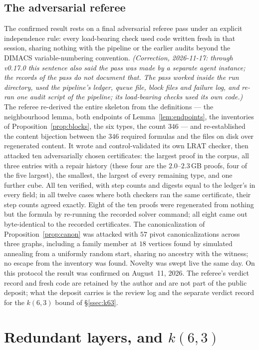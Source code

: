 \documentclass[11pt]{amsart}
\theoremstyle{plain}
\theoremstyle{definition}
\theoremstyle{remark}
\begin{document}
\subsection{The adversarial referee}\label{ssec:referee}
The confirmed result rests on a final adversarial referee pass under an
explicit independence rule: every load-bearing check used code written
fresh in that session, sharing nothing with the pipeline or the earlier
audits beyond the DIMACS variable-numbering convention.
\emph{(Correction, 2026-11-17: through v0.17.0 this sentence also said
the pass was made by a separate agent instance; the records of the pass
do not document that. The pass worked inside the run directory, used the
pipeline's ledger, queue file, block files and failure log, and re-ran
one audit script of the pipeline; its load-bearing checks used its own
code.)} The referee re-derived the entire
skeleton from the definitions --- the neighbourhood lemma, both
endpoints of Lemma~\ref{lem:endpoints}, the inventories of
Proposition~\ref{prop:blocks}, the six types, the count $346$ --- and
re-established the content bijection between the $346$ required
formulas and the files on disk over regenerated content. It wrote and
control-validated its own LRAT checker, then attacked ten adversarially
chosen certificates: the largest proof in the corpus, all three entries
with a repair history (these four are the $2.0$--$2.3$\,GB proofs, four
of the five largest), the smallest, the largest of every remaining type,
and one further cube. All ten verified,
with step counts and digests equal to the ledger's in every field; in
all twelve cases where both checkers ran the same certificate, their
step counts agreed exactly. Eight of the ten proofs were regenerated
from nothing but the formula by re-running the recorded solver command;
all eight came out byte-identical to the recorded certificates. The
canonicalization of Proposition~\ref{prop:canon} was attacked with $57$
pivot canonicalizations across three graphs, including a family member
at $18$ vertices found by simulated annealing from a uniformly random
start, sharing no ancestry with the witness; no escape from the
inventory was found. Novelty was swept live the same day. On this
protocol the result was confirmed on August~11, 2026. The referee's
verdict record and fresh code are retained by the author and are not part
of the public deposit; what the deposit carries is the review log and the
separate verdict record for the $k(6,3)$ bound of \S\ref{ssec:k63}.

\section{Redundant layers, and $k(6,3)$}\label{sec:secondary}
\end{document}
